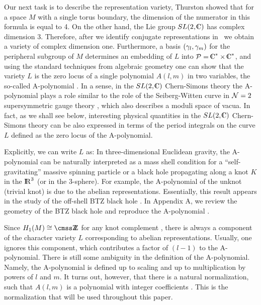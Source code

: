 Our next task is to describe the representation variety,
%
\eqn{}
%
Thurston showed that for a space $M$ with a single torus boundary,
the dimension of the numerator in this formula is equal to 4.
On the other hand, the Lie group $SL(2,\IC)$ has complex dimension 3.
Therefore, after we identify conjugate representations in \ldef\
we obtain a variety
of complex dimension one.
Furthermore, a basis $(\gamma_l, \gamma_m)$ for the peripheral subgroup of $M$
determines an embedding of $L$ into $\CP = \IC^* \times \IC^*$, and
using the standard techniques from algebraic geometry one
can show that the variety $L$ is the zero locus of a single
polynomial $A(l,m)$ in two variables, the so-called A-polynomial \CCGLS.
In a sense, in the $SL(2,\IC)$ Chern-Simons theory the A-polynomial
plays a role similar to the role of the Seiberg-Witten curve
in ${\cal N}=2$ supersymmetric gauge theory \SW, which also describes
a moduli space of vacua. In fact, as we shall see below,
interesting physical quantities in the $SL(2,\IC)$ Chern-Simons
theory can be also expressed in terms of the period integrals
on the curve $L$ defined as the  zero locus of the A-polynomial.

Explicitly, we can write $L$ as:
%
\eqn{}
%
In three-dimensional Euclidean gravity, the A-polynomial
can be naturally interpreted as a mass shell condition
for a ``self-gravitating'' massive spinning particle
or a black hole
propagating along a knot $K$ in the $\relax{\rm I\kern-.18em R}^3$ (or in the 3-sphere).
For example, the A-polynomial of the unknot (trivial knot) is
%
\eqn{}
%
due to the abelian representations.
Essentially, this result appears in the study of the off-shell
BTZ black hole .
In Appendix A, we review the geometry of the BTZ black hole
and reproduce the A-polynomial \aunknot.

Since $H_1(M) \cong \Z$ for any knot complement \mkcompl,
there is always a component of the character variety $L$ corresponding
to abelian representations. Usually, one ignores this component,
which contributes a factor of $(l-1)$ to the A-polynomial.
There is still some ambiguity in the definition of the A-polynomial.
Namely, the A-polynomial is defined up to scaling
and up to multiplication by powers of $l$ and $m$.
It turns out, however, that there is a natural normalization,
such that $A(l,m)$ is a polynomial with integer coefficients \CCGLS.
This is the normalization that will be used throughout this paper.

